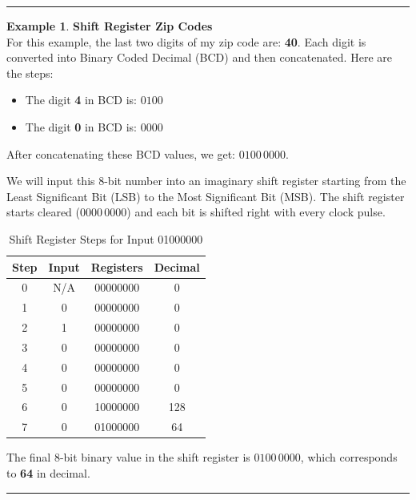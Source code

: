 \documentclass[12pt]{article}
\theoremstyle{definition}
\newtheorem{example}{Example}
\newenvironment{examp}
{
	\vspace{.5cm}
	\hrule
\begin{example}\upshape}
	{\hrule
		\vspace{0.5cm}
\end{example}}
\begin{document}
\begin{examp}
	\textbf{Shift Register Zip Codes}\\
	For this example, the last two digits of my zip code are: \textbf{40}. Each digit is converted into Binary Coded Decimal (BCD) and then concatenated. Here are the steps:
	\begin{itemize}
		\item The digit \textbf{4} in BCD is: \( 0100 \)
		\item The digit \textbf{0} in BCD is: \( 0000 \)
	\end{itemize}

	After concatenating these BCD values, we get: \( 0100 \, 0000 \).

	We will input this 8-bit number into an imaginary shift register starting from the Least Significant Bit (LSB) to the Most Significant Bit (MSB). The shift register starts cleared (\( 0000 \, 0000 \)) and each bit is shifted right with every clock pulse.
	\begin{table}[H]
		\centering
		\renewcommand{\arraystretch}{1.5} %
		\begin{tabular}{|c|c|c|c|}
			\hline
			\rowcolor{gray!20}
			\textbf{Step} & \textbf{Input} & \textbf{Registers} & \textbf{Decimal} \\ \hline
			0             & N/A            & 00000000           & 0                \\ \hline
			1             & 0              & 00000000           & 0                \\ \hline
			2             & 1              & 00000000           & 0                \\ \hline
			3             & 0              & 00000000           & 0                \\ \hline
			4             & 0              & 00000000           & 0                \\ \hline
			5             & 0              & 00000000           & 0                \\ \hline
			6             & 0              & 10000000           & 128              \\ \hline
			7             & 0              & 01000000           & 64               \\ \hline
		\end{tabular}
		\caption{Shift Register Steps for Input 01000000}
		\label{table:shift_register}
	\end{table}

	The final 8-bit binary value in the shift register is \( 0100 \, 0000 \), which corresponds to \textbf{64} in decimal.
	\vspace{5mm}
\end{examp}
\end{document}
